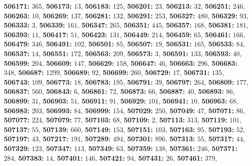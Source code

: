 \textsf{\bfseries 506171:} $365$, \textsf{\bfseries 506173:} $13$, \textsf{\bfseries 506183:} $125$, \textsf{\bfseries 506201:} $23$, \textsf{\bfseries 506213:} $32$, \textsf{\bfseries 506251:} $246$, \textsf{\bfseries 506263:} $10$, \textsf{\bfseries 506269:} $137$, \textsf{\bfseries 506281:} $132$, \textsf{\bfseries 506291:} $253$, \textsf{\bfseries 506327:} $480$, \textsf{\bfseries 506329:} $93$, \textsf{\bfseries 506333:} $3$, \textsf{\bfseries 506339:} $161$, \textsf{\bfseries 506347:} $265$, \textsf{\bfseries 506351:} $445$, \textsf{\bfseries 506357:} $168$, \textsf{\bfseries 506381:} $181$, \textsf{\bfseries 506393:} $11$, \textsf{\bfseries 506417:} $51$, \textsf{\bfseries 506423:} $131$, \textsf{\bfseries 506449:} $214$, \textsf{\bfseries 506459:} $65$, \textsf{\bfseries 506461:} $166$, \textsf{\bfseries 506479:} $346$, \textsf{\bfseries 506491:} $102$, \textsf{\bfseries 506501:} $85$, \textsf{\bfseries 506507:} $19$, \textsf{\bfseries 506531:} $165$, \textsf{\bfseries 506533:} $84$, \textsf{\bfseries 506537:} $14$, \textsf{\bfseries 506551:} $172$, \textsf{\bfseries 506563:} $209$, \textsf{\bfseries 506573:} $3$, \textsf{\bfseries 506591:} $133$, \textsf{\bfseries 506593:} $40$, \textsf{\bfseries 506599:} $204$, \textsf{\bfseries 506609:} $147$, \textsf{\bfseries 506629:} $158$, \textsf{\bfseries 506647:} $46$, \textsf{\bfseries 506663:} $296$, \textsf{\bfseries 506683:} $348$, \textsf{\bfseries 506687:} $1299$, \textsf{\bfseries 506689:} $92$, \textsf{\bfseries 506699:} $260$, \textsf{\bfseries 506729:} $17$, \textsf{\bfseries 506731:} $135$, \textsf{\bfseries 506743:} $109$, \textsf{\bfseries 506773:} $18$, \textsf{\bfseries 506783:} $195$, \textsf{\bfseries 506791:} $39$, \textsf{\bfseries 506797:} $264$, \textsf{\bfseries 506809:} $177$, \textsf{\bfseries 506837:} $560$, \textsf{\bfseries 506843:} $6$, \textsf{\bfseries 506861:} $72$, \textsf{\bfseries 506873:} $66$, \textsf{\bfseries 506887:} $40$, \textsf{\bfseries 506893:} $86$, \textsf{\bfseries 506899:} $31$, \textsf{\bfseries 506903:} $51$, \textsf{\bfseries 506911:} $91$, \textsf{\bfseries 506929:} $101$, \textsf{\bfseries 506941:} $10$, \textsf{\bfseries 506963:} $68$, \textsf{\bfseries 506983:} $203$, \textsf{\bfseries 506993:} $84$, \textsf{\bfseries 506999:} $154$, \textsf{\bfseries 507029:} $250$, \textsf{\bfseries 507049:} $47$, \textsf{\bfseries 507071:} $86$, \textsf{\bfseries 507077:} $224$, \textsf{\bfseries 507079:} $77$, \textsf{\bfseries 507103:} $68$, \textsf{\bfseries 507109:} $2$, \textsf{\bfseries 507113:} $313$, \textsf{\bfseries 507119:} $101$, \textsf{\bfseries 507137:} $55$, \textsf{\bfseries 507139:} $660$, \textsf{\bfseries 507149:} $153$, \textsf{\bfseries 507151:} $103$, \textsf{\bfseries 507163:} $95$, \textsf{\bfseries 507193:} $52$, \textsf{\bfseries 507197:} $43$, \textsf{\bfseries 507217:} $191$, \textsf{\bfseries 507289:} $494$, \textsf{\bfseries 507301:} $896$, \textsf{\bfseries 507313:} $55$, \textsf{\bfseries 507317:} $44$, \textsf{\bfseries 507329:} $123$, \textsf{\bfseries 507347:} $113$, \textsf{\bfseries 507349:} $63$, \textsf{\bfseries 507359:} $138$, \textsf{\bfseries 507361:} $246$, \textsf{\bfseries 507371:} $284$, \textsf{\bfseries 507383:} $14$, \textsf{\bfseries 507401:} $146$, \textsf{\bfseries 507421:} $94$, \textsf{\bfseries 507431:} $26$, \textsf{\bfseries 507461:} $379$, 

